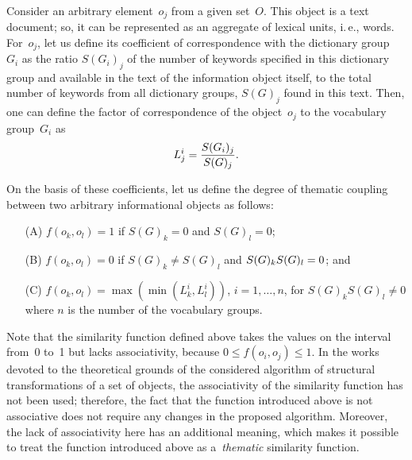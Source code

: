\begin{multicols}{2}
\begin{figure*}[b] %
\vspace*{1pt}
    \begin{center}  
  \mbox{%
 \epsfxsize=94.043mm 
 }
\end{center}
\vspace*{-10pt}
\end{figure*}

     Consider an arbitrary element~$o_j$ from a given set~$O$. This object is a 
text document; so, it can be represented as an aggregate of lexical units, i.\,e., 
words. For~$o_j$, let us define its coefficient of correspondence with the dictionary 
group~$G_i$ as the ratio $S(G_i)_j$ of the number of keywords specified in this 
dictionary group and available in the text of the information object itself, to the 
total number of keywords from all dictionary groups, $S(G)_j$ found in this text. 
Then, one can define the factor of correspondence of the object~$o_j$ to the 
vocabulary group~$G_i$ as
     $$
     L^i_j = \displaystyle\frac{\displaystyle S(G_i)_j\mathstrut}{\displaystyle S(G)_j\mathstrut}.
        $$
     
     On the basis of these coefficients, let us define the degree of thematic coupling 
between two arbitrary informational objects as follows:
     \begin{itemize}
     \item[(A)] $f(o_k, o_l) = 1$ if $ S(G)_k = 0$ and  $S(G)_l = 0$;
     \item[(B)] $f(o_k, o_l) = 0$ if  $S(G)_k\not= S(G)_l$ 
     and $S(G)_k S(G)_l\linebreak = 0$; and
     \item[(C)] $f(o_k, o_l) = \max\left( \min\left(L^i_k, L^i_l\right) \right)$, $i = 1, 
\ldots, n$,  for $S(G)_k  S(G)_l\not= 0$
     where $n$ is the number of the vocabulary groups.
     \end{itemize}

     
     Note that the similarity function defined above takes the values on the 
interval from~0 to~1 but lacks associativity, because $0 \leq f(o_i, o_j) \leq 1$. In 
the works devoted to the theoretical grounds of the considered algorithm of 
structural transformations of a set of objects, the associativity of the similarity 
function has not been used; therefore, the fact that the function introduced above is 
not associative does not require any changes in the proposed algorithm. Moreover, 
the lack of associativity here has an additional meaning, which makes it possible to 
treat the function introduced above as a~\textit{thematic} similarity function.
     

\end{multicols}
